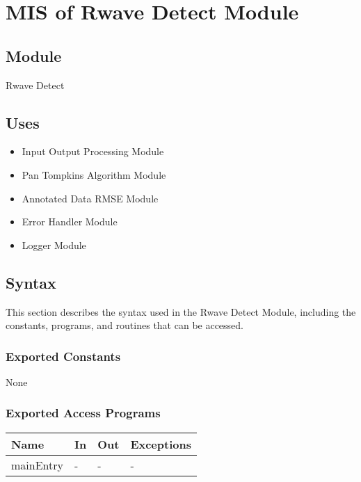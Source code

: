 \documentclass[12pt, titlepage]{article}
\begin{document}
\section{MIS of Rwave Detect Module} \label{MIS_Rwave}

\subsection{Module}

Rwave Detect

\subsection{Uses}

\begin{itemize}
\item Input Output Processing Module
\item Pan Tompkins Algorithm Module
\item Annotated Data RMSE Module
\item Error Handler Module
\item Logger Module
\end{itemize}

\subsection{Syntax}

This section describes the syntax used in the Rwave Detect Module, including the
constants, programs, and routines that can be accessed.

\subsubsection{Exported Constants}

None

\subsubsection{Exported Access Programs}

\begin{center}
\begin{tabular}{p{2cm} p{4cm} p{4cm} p{2cm}}
\hline
\textbf{Name} & \textbf{In} & \textbf{Out} & \textbf{Exceptions} \\
\hline
mainEntry & - & - & - \\
\hline
\end{tabular}
\end{center}
\end{document}
